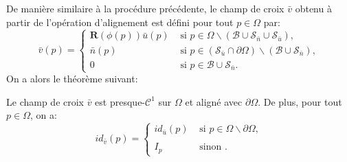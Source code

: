 De manière similaire à la procédure précédente, le champ de croix $\bar{v}$ obtenu à partir de l'opération d'alignement est défini pour tout $p\in\Omega$ par:
\begin{equation}
\bar{v}(p)=
\left\{
\begin{array}{ll}
\mathbf{R}(\phi(p))\bar{u}(p) & \mbox{ si } p\in\Omega\backslash(\mathcal{B}\cup\mathcal{S}_{\bar{n}}\cup\mathcal{S}_{\bar{u}}),\\[0.5cm]
\bar{n}(p) & \mbox{ si } p\in(\mathcal{S}_{\bar{u}}\cap\partial\Omega)\backslash(\mathcal{B}\cup\mathcal{S}_{\bar{n}}),\\[0.5cm]
0 & \mbox{ si } p\in\mathcal{B}\cup\mathcal{S}_{\bar{n}}.
\end{array}
\right.
\label{eqn:etude_def_v_second}
\end{equation}
On a alors le théorème suivant:
\begin{theorem}
\label{thm:theorem3}
Le champ de croix $\bar{v}$ est presque-$\mathcal{C}^1$ sur $\Omega$ et aligné avec $\partial\Omega$. De plus, pour tout $p\in\Omega$, on a:
\begin{equation}
id_{\bar{v}}(p)=
\left\{
\begin{array}{ll}
    id_{\bar{u}}(p) & \mbox{ si } p\in\Omega\backslash\partial\Omega,\\\\
    I_p & \mbox{ sinon }.
\end{array}
\right.
\end{equation}
\end{theorem}
